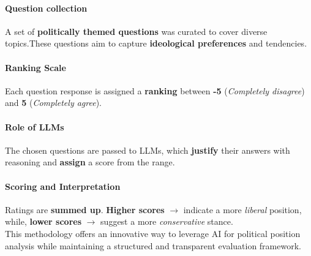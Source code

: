 \documentclass{article}
\begin{document}
\paragraph{Question collection} A set of \textbf{politically themed questions} was curated to cover diverse topics.These questions aim to capture \textbf{ideological preferences} and tendencies.

\paragraph{Ranking Scale} Each question response is assigned a \textbf{ranking} between \textbf{-5} (\textit{Completely disagree}) and \textbf{5} (\textit{Completely agree}).

\paragraph{Role of LLMs} The chosen questions are passed to LLMs, which \textbf{justify} their answers with reasoning and \textbf{assign} a score from the range.

\paragraph{Scoring and Interpretation} Ratings are \textbf{summed up}. \textbf{Higher scores} $\rightarrow$ indicate a more \textit{liberal} position, while, \textbf{lower scores} $\rightarrow$ suggest a more \textit{conservative} stance.\\

This methodology offers an innovative way to leverage AI for political position analysis while maintaining a structured and transparent evaluation framework.
\end{document}
